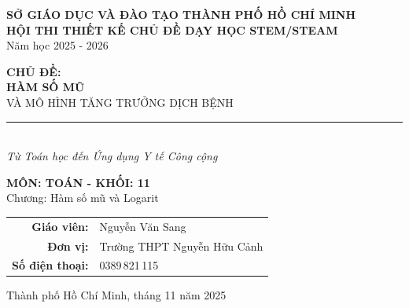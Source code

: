 \documentclass[12pt,a4paper]{article}
\begin{document}
\begin{titlepage}

\vspace{2cm}
\begin{center}
{\LARGE\bfseries\color{primary}\sffamily SỞ GIÁO DỤC VÀ ĐÀO TẠO THÀNH PHỐ HỒ CHÍ MINH}\\
\vspace{0.5cm}
{\Large\bfseries\sffamily HỘI THI THIẾT KẾ CHỦ ĐỀ DẠY HỌC STEM/STEAM}\\
\vspace{0.3cm}
{\large\sffamily Năm học 2025 - 2026}

\vspace{2cm}

\begin{tcolorbox}[width=0.9\textwidth, colback=gray!5, colframe=primary, arc=2mm, boxrule=1pt]
    \centering
    {\LARGE\bfseries\sffamily CHỦ ĐỀ:} \\[0.3cm]
    {\Huge\bfseries\color{mathblue}\sffamily HÀM SỐ MŨ}\\
    \vspace{0.2cm}
    {\Large\sffamily VÀ MÔ HÌNH TĂNG TRƯỞNG DỊCH BỆNH}\\
    \vspace{0.3cm}
    \rule{0.6\textwidth}{0.5pt}\\
    \vspace{0.2cm}
    {\large\itshape\sffamily Từ Toán học đến Ứng dụng Y tế Công cộng}
\end{tcolorbox}

\vspace{1.5cm}
{\Large\bfseries\sffamily MÔN: TOÁN - KHỐI: 11}\\
\vspace{0.3cm}
{\large\sffamily Chương: Hàm số mũ và Logarit}

\vfill
\large
\begin{tabular}{rl}
\sffamily\bfseries Giáo viên: & Nguyễn Văn Sang\\
\sffamily\bfseries Đơn vị: & Trường THPT Nguyễn Hữu Cảnh\\
\sffamily\bfseries Số điện thoại: & 0389\,821\,115\\
\end{tabular}

\vspace{1cm}
{\large\sffamily Thành phố Hồ Chí Minh, tháng 11 năm 2025}
\end{center}
\end{titlepage}
\end{document}
